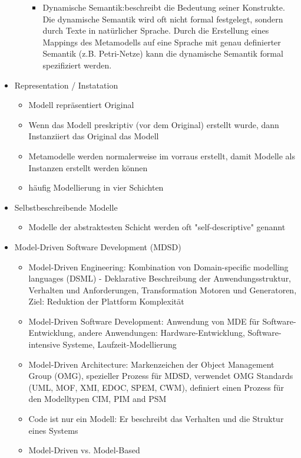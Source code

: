 \documentclass[paper=a4, fontsize=11pt]{scrartcl} %
\numberwithin{equation}{section} %
\numberwithin{figure}{section} %
\numberwithin{table}{section} %
\begin{document}
\begin{itemize}
\begin{itemize}
\begin{itemize}
      \item Dynamische Semantik:beschreibt die Bedeutung seiner Konstrukte. Die dynamische Semantik wird oft nicht formal festgelegt, sondern durch Texte in natürlicher Sprache. Durch die Erstellung eines Mappings des Metamodells auf eine Sprache mit genau definierter Semantik (z.B. Petri-Netze) kann die dynamische Semantik formal spezifiziert werden.
    \end{itemize}
  \end{itemize}
  \item Representation / Instatation
  \begin{itemize}
    \item Modell repräsentiert Original
    \item Wenn das Modell preskriptiv (vor dem Original) erstellt wurde, dann Instanziiert das Original das Modell
    \item Metamodelle werden normalerweise im vorraus erstellt, damit Modelle als Instanzen erstellt werden können
    \item häufig Modellierung in vier Schichten
  \end{itemize}
  \item Selbstbeschreibende Modelle
  \begin{itemize}
    \item Modelle der abstraktesten Schicht werden oft "self-descriptive" genannt
  \end{itemize}
  \item Model-Driven Software Development (MDSD)
  \begin{itemize}
    \item Model-Driven Engineering: Kombination von Domain-specific modelling languages (DSML) - Deklarative Beschreibung der Anwendungsstruktur, Verhalten und Anforderungen, Transformation Motoren und Generatoren, Ziel: Reduktion der Plattform Komplexität
    \item Model-Driven Software Development: Anwendung von MDE für Software-Entwicklung, andere Anwendungen: Hardware-Entwicklung, Software-intensive Systeme, Laufzeit-Modellierung
    \item Model-Driven Architecture: Markenzeichen der Object Management Group (OMG), spezieller Prozess für MDSD, verwendet OMG Standards (UML, MOF, XMI, EDOC, SPEM, CWM), definiert einen Prozess für den Modelltypen CIM, PIM and PSM
    \item Code ist nur ein Modell: Er beschreibt das Verhalten und die Struktur eines Systems
    \item Model-Driven vs. Model-Based

\end{itemize}
\end{itemize}
\end{document}
